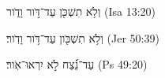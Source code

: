 
\begin{exe}

\ex\label{antdur_<D_exs1}
\texthebrew{
וְלֹ֥א תִשְׁכֹּ֖ן עַד־דֹּ֣ור וָדֹ֑ור 
} (Isa 13:20)

\ex\label{antdur_<D_exs2}
\texthebrew{
וְלֹ֥א תִשְׁכֹּ֖ון עַד־דֹּ֥ור וָדֹֽור׃ 
} (Jer 50:39)

\ex\label{antdur_<D_exs3}
\texthebrew{
עַד־נֵ֝֗צַח לֹ֣א יִרְאוּ־אֹֽור׃ 
} (Ps 49:20)

\end{exe}
